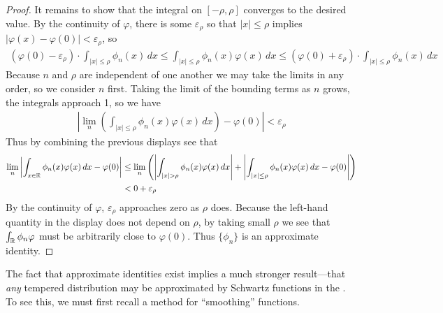 \begin{proof}
      It remains to show that the integral on $[-\rho,\rho]$ converges to the desired value.
      By the continuity of $\varphi$, there is some $\varepsilon_\rho$ so that $|x|\le\rho$ implies $|\varphi(x)-\varphi(0)|<\varepsilon_\rho$, so
      \begin{align*}
        (\varphi(0)-\varepsilon_\rho)\cdot \int_{|x|\le\rho} \phi_n(x)\,dx
        \le \int_{|x|\le\rho} \phi_n(x)\varphi(x)\,dx
        \le (\varphi(0)+\varepsilon_\rho)\cdot \int_{|x|\le\rho} \phi_n(x)\, dx
      \end{align*}
      Because $n$ and $\rho$ are independent of one another we may take the limits in any order, so we consider $n$ first.
      Taking the limit of the bounding terms as $n$ grows, the integrals approach 1, so we have
      \begin{align*}
        \left| \lim_n\left(\int_{|x|\le\rho} \phi_n(x)\varphi(x)\,dx\right) - \varphi(0) \right|
        < \varepsilon_\rho
      \end{align*}
      Thus by combining the previous displays see that 
      \begin{align*}
        \lim_n\left| \int_{x\in\R} \phi_n(x)\varphi(x)\,dx -\varphi(0)\right|
        &\le \lim_n \left( \left| \int_{|x|>\rho} \phi_n(x)\varphi(x)\,dx \right|
        + \left| \int_{|x|\le\rho} \phi_n(x)\varphi(x)\,dx -\varphi(0)\right| \right)
        \\&< 0 + \varepsilon_\rho
      \end{align*}
      By the continuity of $\varphi$, $\varepsilon_\rho$ approaches zero as $\rho$ does.
      Because the left-hand quantity in the display does not depend on $\rho$, by taking small $\rho$ we see that $\int_\mathbb{R} \phi_n\varphi$ must be arbitrarily close to $\varphi(0)$.
      Thus $\{\phi_n\}$ is an approximate identity.
    \end{proof}

    The fact that approximate identities exist implies a much stronger result---that \emph{any} tempered distribution may be approximated by Schwartz functions in the \ws.
    To see this, we must first recall a method for ``smoothing'' functions.

